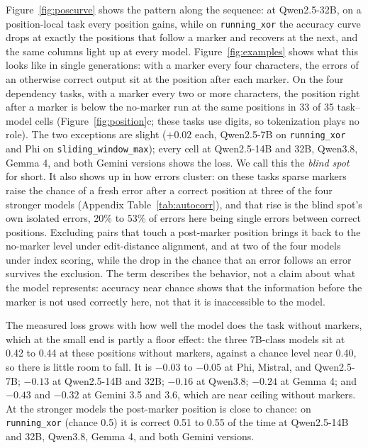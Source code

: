 \documentclass[10pt]{article} %
\newcommand{\task}[1]{\texttt{#1}}
\begin{document}
Figure~\ref{fig:poscurve} shows the pattern along the sequence: at Qwen2.5-32B, on a position-local task every position gains, while on \task{running\_xor} the accuracy curve drops at exactly the positions that follow a marker and recovers at the next, and the same columns light up at every model. Figure~\ref{fig:examples} shows what this looks like in single generations: with a marker every four characters, the errors of an otherwise correct output sit at the position after each marker. On the four dependency tasks, with a marker every two or more characters, the position right after a marker is below the no-marker run at the same positions in 33 of 35 task--model cells (Figure~\ref{fig:position}c; these tasks use digits, so tokenization plays no role). The two exceptions are slight ($+0.02$ each, Qwen2.5-7B on \task{running\_xor} and Phi on \task{sliding\_window\_max}); every cell at Qwen2.5-14B and 32B, Qwen3.8, Gemma 4, and both Gemini versions shows the loss. We call this the \emph{blind spot} for short. It also shows up in how errors cluster: on these tasks sparse markers raise the chance of a fresh error after a correct position at three of the four stronger models (Appendix Table~\ref{tab:autocorr}), and that rise is the blind spot's own isolated errors, 20\% to 53\% of errors here being single errors between correct positions. Excluding pairs that touch a post-marker position brings it back to the no-marker level under edit-distance alignment, and at two of the four models under index scoring, while the drop in the chance that an error follows an error survives the exclusion. The term describes the behavior, not a claim about what the model represents: accuracy near chance shows that the information before the marker is not used correctly here, not that it is inaccessible to the model. 

The measured loss grows with how well the model does the task without markers, which at the small end is partly a floor effect: the three 7B-class models sit at 0.42 to 0.44 at these positions without markers, against a chance level near 0.40, so there is little room to fall. It is $-0.03$ to $-0.05$ at Phi, Mistral, and Qwen2.5-7B; $-0.13$ at Qwen2.5-14B and 32B; $-0.16$ at Qwen3.8; $-0.24$ at Gemma 4; and $-0.43$ and $-0.32$ at Gemini 3.5 and 3.6, which are near ceiling without markers. At the stronger models the post-marker position is close to chance: on \task{running\_xor} (chance 0.5) it is correct 0.51 to 0.55 of the time at Qwen2.5-14B and 32B, Qwen3.8, Gemma 4, and both Gemini versions. 
\end{document}
